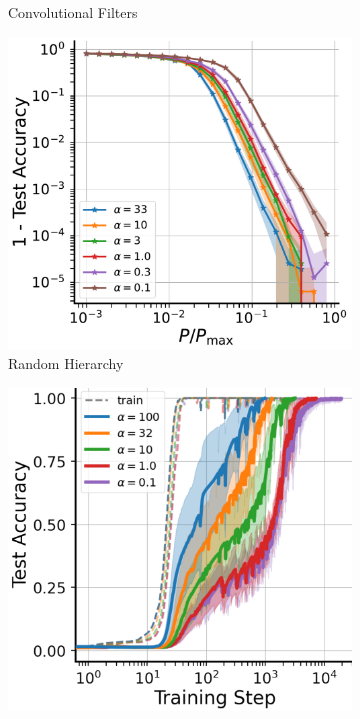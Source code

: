 \documentclass{article}
\theoremstyle{plain}
\theoremstyle{definition}
\theoremstyle{remark}
\begin{document}
\begin{figure}[t]
\begin{subfigure}{0.22\textwidth}
        \caption{Convolutional Filters}
    \end{subfigure}
    \begin{subfigure}{0.23\textwidth}
        \centering
        \includegraphics[width=\linewidth]{fig/deep-networks/rhm_v7.pdf}
        \caption{Random Hierarchy}
    \end{subfigure}
    \begin{subfigure}{0.23\textwidth}
        \centering
        \includegraphics[width=\linewidth]{fig/deep-networks/grokking/grokking.pdf}

\end{subfigure}
\end{figure}
\end{document}
